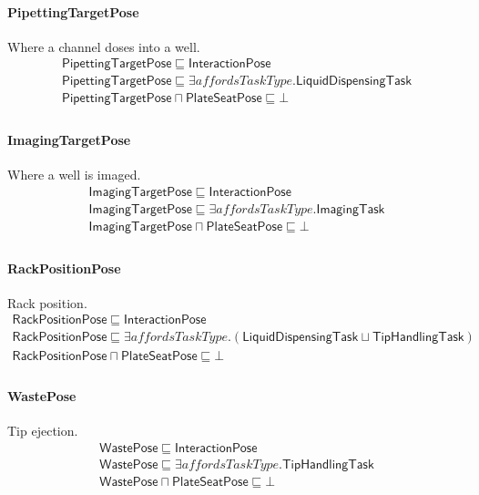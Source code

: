 \documentclass[10pt]{article}
\begin{document}
\paragraph{PipettingTargetPose} Where a channel doses into a well.
\[\begin{array}{l}
\mathsf{PipettingTargetPose} \sqsubseteq  \mathsf{InteractionPose} \\
\mathsf{PipettingTargetPose} \sqsubseteq  \exists \mathit{affordsTaskType}.\mathsf{LiquidDispensingTask} \\
\mathsf{PipettingTargetPose} \sqcap  \mathsf{PlateSeatPose} \sqsubseteq  \bot  \\
\end{array}\]
\paragraph{ImagingTargetPose} Where a well is imaged.
\[\begin{array}{l}
\mathsf{ImagingTargetPose} \sqsubseteq  \mathsf{InteractionPose} \\
\mathsf{ImagingTargetPose} \sqsubseteq  \exists \mathit{affordsTaskType}.\mathsf{ImagingTask} \\
\mathsf{ImagingTargetPose} \sqcap  \mathsf{PlateSeatPose} \sqsubseteq  \bot  \\
\end{array}\]
\paragraph{RackPositionPose} Rack position.
\[\begin{array}{l}
\mathsf{RackPositionPose} \sqsubseteq  \mathsf{InteractionPose} \\
\mathsf{RackPositionPose} \sqsubseteq  \exists \mathit{affordsTaskType}.(\mathsf{LiquidDispensingTask} \sqcup  \mathsf{TipHandlingTask}) \\
\mathsf{RackPositionPose} \sqcap  \mathsf{PlateSeatPose} \sqsubseteq  \bot  \\
\end{array}\]
\paragraph{WastePose} Tip ejection.
\[\begin{array}{l}
\mathsf{WastePose} \sqsubseteq  \mathsf{InteractionPose} \\
\mathsf{WastePose} \sqsubseteq  \exists \mathit{affordsTaskType}.\mathsf{TipHandlingTask} \\
\mathsf{WastePose} \sqcap  \mathsf{PlateSeatPose} \sqsubseteq  \bot  \\
\end{array}\]
\end{document}
